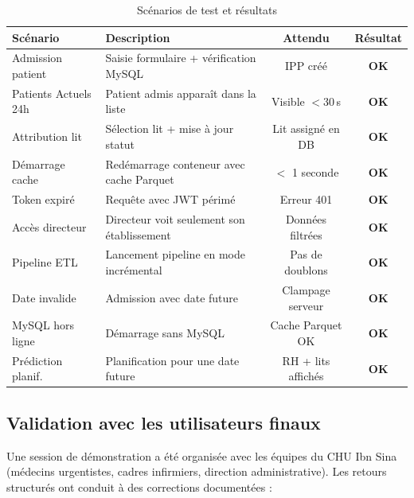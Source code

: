 \documentclass[12pt,a4paper]{report}
\begin{document}
	\begin{table}[H]
		\centering
		\caption{Scénarios de test et résultats}
		\renewcommand{\arraystretch}{1.2}
		\begin{tabularx}{\textwidth}{lXcc}
			\toprule
			\textbf{Scénario} & \textbf{Description} & \textbf{Attendu} & \textbf{Résultat} \\
			\midrule
			Admission patient      & Saisie formulaire + vérification MySQL       & IPP créé         & \textcolor{vertOK}{\textbf{OK}} \\
			Patients Actuels 24h   & Patient admis apparaît dans la liste         & Visible $<$30\,s   & \textcolor{vertOK}{\textbf{OK}} \\
			Attribution lit        & Sélection lit + mise à jour statut           & Lit assigné en DB & \textcolor{vertOK}{\textbf{OK}} \\
			Démarrage cache        & Redémarrage conteneur avec cache Parquet     & $<$ 1 seconde    & \textcolor{vertOK}{\textbf{OK}} \\
			Token expiré           & Requête avec JWT périmé                      & Erreur 401       & \textcolor{vertOK}{\textbf{OK}} \\
			Accès directeur        & Directeur voit seulement son établissement   & Données filtrées & \textcolor{vertOK}{\textbf{OK}} \\
			Pipeline ETL           & Lancement pipeline en mode incrémental       & Pas de doublons  & \textcolor{vertOK}{\textbf{OK}} \\
			Date invalide          & Admission avec date future                   & Clampage serveur & \textcolor{vertOK}{\textbf{OK}} \\
			MySQL hors ligne       & Démarrage sans MySQL                         & Cache Parquet OK & \textcolor{vertOK}{\textbf{OK}} \\
			Prédiction planif.     & Planification pour une date future           & RH + lits affichés & \textcolor{vertOK}{\textbf{OK}} \\
			\bottomrule
		\end{tabularx}
	\end{table}
	\newpage
	\subsection{Validation avec les utilisateurs finaux}
	
	Une session de démonstration a été organisée avec les équipes du CHU Ibn Sina
	(médecins urgentistes, cadres infirmiers, direction administrative). Les retours
	structurés ont conduit à des corrections documentées :
	
\end{document}
